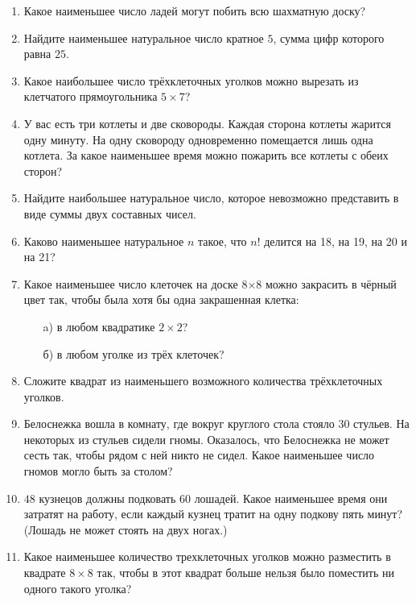 \documentclass{article}
\begin{document}
\begin{enumerate}[label*=\protect\fbox{\arabic{enumi}}]

\item Какое наименьшее число ладей могут побить всю шахматную доску?

\item Найдите наименьшее натуральное число кратное $5$, сумма цифр которого равна $25$.

\item Какое наибольшее число трёхклеточных уголков можно вырезать из клетчатого прямоугольника $5 \times 7$?

\item У вас есть три котлеты и две сковороды. Каждая сторона котлеты жарится одну минуту. На одну сковороду одновременно помещается лишь одна котлета. За какое наименьшее время можно пожарить все котлеты с обеих сторон?

\item Найдите наибольшее натуральное число, которое невозможно представить в виде суммы двух составных чисел.

\item Каково наименьшее натуральное $n$ такое, что $n!$ делится на 18, на 19, на 20 и на 21?

\item Какое наименьшее число клеточек на доске 8×8 можно закрасить в чёрный цвет так, чтобы была хотя бы одна закрашенная клетка:
\begin{enumerate} 
	\item[a)] в любом квадратике $2\times2$?
	\item[б)] в любом уголке из трёх клеточек?
\end{enumerate}
\item Сложите квадрат из наименьшего возможного количества трёхклеточных уголков. 

\item Белоснежка вошла в комнату, где вокруг круглого стола стояло 30 стульев. На некоторых из стульев сидели гномы. Оказалось, что Белоснежка не может сесть так, чтобы рядом с ней никто не сидел. Какое наименьшее число гномов могло быть за столом?

\item $48$ кузнецов должны подковать $60$ лошадей. Какое наименьшее время они затратят на работу, если каждый кузнец тратит на одну подкову пять минут? (Лошадь не может стоять на двух ногах.)

\item Какое наименьшее количество трехклеточных уголков можно разместить в квадрате $8 \times 8$ так, чтобы в этот квадрат больше нельзя было поместить ни одного такого уголка? 


\end{enumerate}
\end{document}
